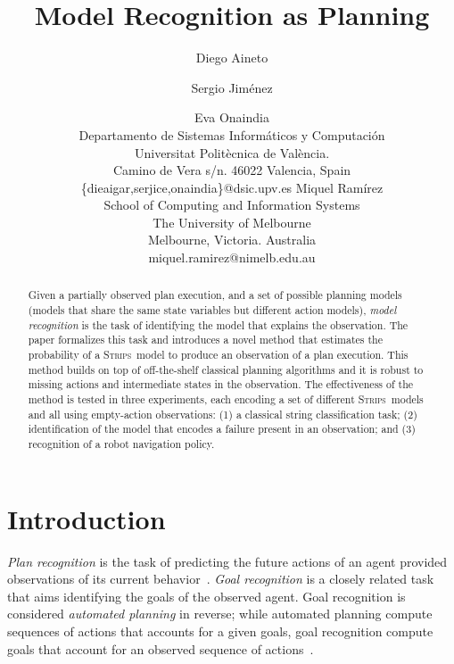 \documentclass[letterpaper]{article} %
\newcommand{\strips}{\textsc{Strips}}     %
\begin{document}
\title{Model Recognition as Planning}

\author{Diego Aineto \and Sergio Jim\'enez\and Eva Onaindia\\
{\scriptsize Departamento de Sistemas Inform\'aticos y Computaci\'on}\\
{\scriptsize Universitat Polit\`ecnica de Val\`encia.}\\
{\scriptsize Camino de Vera s/n. 46022 Valencia, Spain}\\
{\scriptsize \{dieaigar,serjice,onaindia\}@dsic.upv.es}
\And Miquel Ram\'irez\\
{\scriptsize School of Computing and Information Systems}\\
{\scriptsize The University of Melbourne}\\
{\scriptsize Melbourne, Victoria. Australia}\\
{\scriptsize miquel.ramirez@nimelb.edu.au}}


\maketitle
\begin{abstract}
Given a partially observed plan execution, and a set of possible planning models (models that share the same state variables but different action models), {\em model recognition} is the task of identifying the model that explains the observation. The paper formalizes this task and introduces a novel method that estimates the probability of a \strips\ model to produce an observation of a plan execution. This method builds on top of off-the-shelf classical planning algorithms and it is robust to missing actions and intermediate states in the observation. The effectiveness of the method is tested in three experiments, each encoding a set of different \strips\ models and all using empty-action observations: (1) a classical string classification task; (2) identification of the model that encodes a failure present in an observation; and (3) recognition of a robot navigation policy.
\end{abstract}

\section{Introduction}
\label{sec:introduction}
{\em Plan recognition} is the task of predicting the future actions of an agent provided observations of its current behavior~\cite{Carberry01}. {\em Goal recognition} is a closely related task that aims identifying the goals of the observed agent. Goal recognition is considered {\em automated planning} in reverse; while automated planning compute sequences of actions that accounts for a given goals, goal recognition compute goals that account for an observed sequence of actions~\cite{geffner:book:2013}.
\end{document}
